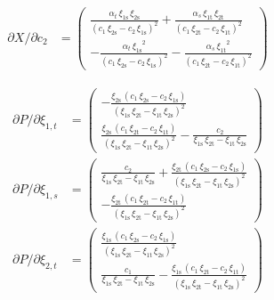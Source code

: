 \documentclass[12pt,a4paper]{extarticle}
\begin{document}
\begin{align*}
\partial X / \partial c_2 &= \left(\begin{array}{c} \frac{\alpha _{t}\,\xi _{\mathrm{1s}}\,\xi _{\mathrm{2s}}}{{\left(c_{1}\,\xi _{\mathrm{2s}}-c_{2}\,\xi _{\mathrm{1s}}\right)}^2}+\frac{\alpha _{s}\,\xi _{\mathrm{1t}}\,\xi _{\mathrm{2t}}}{{\left(c_{1}\,\xi _{\mathrm{2t}}-c_{2}\,\xi _{\mathrm{1t}}\right)}^2}\\ -\frac{\alpha _{t}\,{\xi _{\mathrm{1s}}}^2}{{\left(c_{1}\,\xi _{\mathrm{2s}}-c_{2}\,\xi _{\mathrm{1s}}\right)}^2}-\frac{\alpha _{s}\,{\xi _{\mathrm{1t}}}^2}{{\left(c_{1}\,\xi _{\mathrm{2t}}-c_{2}\,\xi _{\mathrm{1t}}\right)}^2} \end{array}\right)
\end{align*}

\begin{align*}
\partial P / \partial \xi_{1,t} &= \left(\begin{array}{c} -\frac{\xi _{\mathrm{2s}}\,\left(c_{1}\,\xi _{\mathrm{2s}}-c_{2}\,\xi _{\mathrm{1s}}\right)}{{\left(\xi _{\mathrm{1s}}\,\xi _{\mathrm{2t}}-\xi _{\mathrm{1t}}\,\xi _{\mathrm{2s}}\right)}^2}\\ \frac{\xi _{\mathrm{2s}}\,\left(c_{1}\,\xi _{\mathrm{2t}}-c_{2}\,\xi _{\mathrm{1t}}\right)}{{\left(\xi _{\mathrm{1s}}\,\xi _{\mathrm{2t}}-\xi _{\mathrm{1t}}\,\xi _{\mathrm{2s}}\right)}^2}-\frac{c_{2}}{\xi _{\mathrm{1s}}\,\xi _{\mathrm{2t}}-\xi _{\mathrm{1t}}\,\xi _{\mathrm{2s}}} \end{array}\right)\\
\partial P / \partial \xi_{1,s} &= \left(\begin{array}{c} \frac{c_{2}}{\xi _{\mathrm{1s}}\,\xi _{\mathrm{2t}}-\xi _{\mathrm{1t}}\,\xi _{\mathrm{2s}}}+\frac{\xi _{\mathrm{2t}}\,\left(c_{1}\,\xi _{\mathrm{2s}}-c_{2}\,\xi _{\mathrm{1s}}\right)}{{\left(\xi _{\mathrm{1s}}\,\xi _{\mathrm{2t}}-\xi _{\mathrm{1t}}\,\xi _{\mathrm{2s}}\right)}^2}\\ -\frac{\xi _{\mathrm{2t}}\,\left(c_{1}\,\xi _{\mathrm{2t}}-c_{2}\,\xi _{\mathrm{1t}}\right)}{{\left(\xi _{\mathrm{1s}}\,\xi _{\mathrm{2t}}-\xi _{\mathrm{1t}}\,\xi _{\mathrm{2s}}\right)}^2} \end{array}\right)\\
\partial P / \partial \xi_{2,t} &= \left(\begin{array}{c} \frac{\xi _{\mathrm{1s}}\,\left(c_{1}\,\xi _{\mathrm{2s}}-c_{2}\,\xi _{\mathrm{1s}}\right)}{{\left(\xi _{\mathrm{1s}}\,\xi _{\mathrm{2t}}-\xi _{\mathrm{1t}}\,\xi _{\mathrm{2s}}\right)}^2}\\ \frac{c_{1}}{\xi _{\mathrm{1s}}\,\xi _{\mathrm{2t}}-\xi _{\mathrm{1t}}\,\xi _{\mathrm{2s}}}-\frac{\xi _{\mathrm{1s}}\,\left(c_{1}\,\xi _{\mathrm{2t}}-c_{2}\,\xi _{\mathrm{1t}}\right)}{{\left(\xi _{\mathrm{1s}}\,\xi _{\mathrm{2t}}-\xi _{\mathrm{1t}}\,\xi _{\mathrm{2s}}\right)}^2} \end{array}\right) \\

\end{align*}
\end{document}
